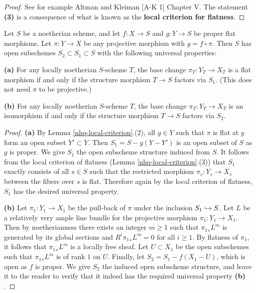 \begin{proof} See for example Altman and Kleiman [A-K 1] Chapter V.
The statement \textbf{(3) } is a consequence of what is known as the
\textbf{local criterion for flatness}. \notready\end{proof}


\begin{theorem}\label{nhq-isomorphism-open}
Let $S$ be a noetherian scheme, and let $f:X \to S$
and $g: Y\to S$ be proper flat morphisms.
Let $\pi : Y \to X$ be any projective morphism with
$g = f\circ \pi$. Then $S$ has open subschemes
$S_2\subset S_1 \subset S$ with the following universal properties:

\textbf{(a) } For any locally noetherian $S$-scheme $T$, the base change
$\pi_T : Y_T \to X_T$ is a flat morphism if and only if the
structure morphism $T\to S$ factors via $S_1$. (This does not need
$\pi$ to be projective.)


\textbf{(b) } For any locally noetherian $S$-scheme $T$, the base change
$\pi_T : Y_T \to X_T$ is an isomorphism if and only if the
structure morphism $T\to S$ factors via $S_2$.
\end{theorem}

\begin{proof} \textbf{(a) } By Lemma \ref{nhq-local-criterion}.(2), all
$y\in Y$ such that $\pi$ is flat at $y$ form an
open subset $Y'\subset Y$. Then $S_1 = S - g(Y - Y')$
is an open subset of $S$ as $g$ is proper.
We give $S_1$ the open subscheme structure induced from $S$.
It follows from the local criterion of flatness
(Lemma  \ref{nhq-local-criterion}.(3))
that $S_1$ exactly consists of all $s\in S$ such that
the restricted morphism $\pi_s : Y_s \to X_s$ between the
fibers over $s$ is flat. Therefore again by the
local criterion of flatness, $S_1$ has the desired universal property.

\textbf{(b) } Let $\pi_1 : Y_1 \to X_1$ be the pull-back of
$\pi$ under the inclusion $S_1 \hookrightarrow S$.
Let $L$ be a relatively very ample
line bundle for the projective morphism $\pi_1 : Y_1\to X_1$.
Then by noetherianness there exists an integer $m\ge 1$ such that
${\pi_1}_*L^m$ is generated by its global sections and $R^i{\pi_1}_*L^m =0$
for all $i \ge 1$. By flatness of $\pi_1$, it follows that
${\pi_1}_*L^m$ is a locally free sheaf. Let $U\subset X_1$ be the
open subschemes such that
${\pi_1}_*L^m$ is of rank $1$ on $U$.
Finally, let $S_2 = S_1 - f(X_1 - U)$, which is open as
$f$ is proper.
We give $S_2$ the induced open subscheme structure,
and leave it to the reader to verify that
it indeed has the required universal property \textbf{(b) }. \notready\end{proof}




